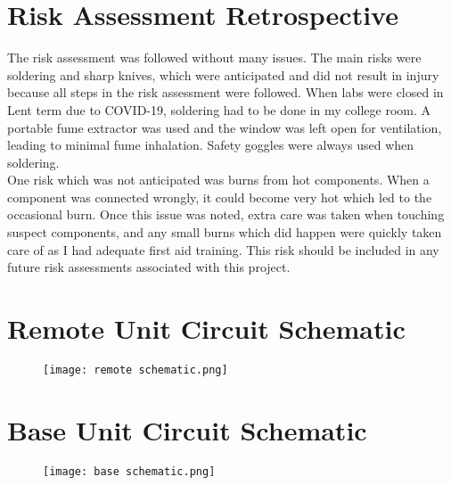 \documentclass[draft]{IIBproject}
\begin{document}










\newpage




\newpage
\appendix
\appendixpage
\addappheadtotoc

\section{Risk Assessment Retrospective}
The risk assessment was followed without many issues. The main risks were soldering and sharp knives, which were anticipated and did not result in injury because all steps in the risk assessment were followed. When labs were closed in Lent term due to COVID-19, soldering had to be done in my college room. A portable fume extractor was used and the window was left open for ventilation, leading to minimal fume inhalation. Safety goggles were always used when soldering.\\

One risk which was not anticipated was burns from hot components. When a component was connected wrongly, it could become very hot which led to the occasional burn. Once this issue was noted, extra care was taken when touching suspect components, and any small burns which did happen were quickly taken care of as I had adequate first aid training. This risk should be included in any future risk assessments associated with this project.\\

\newpage
\section{Remote Unit Circuit Schematic}
\begin{figure}[h!]
	\centering
	\texttt{[image: remote schematic.png]}
\end{figure}

\newpage
\section{Base Unit Circuit Schematic}
\begin{figure}[h!]
	\centering
	\texttt{[image: base schematic.png]}
\end{figure}
\end{document}
